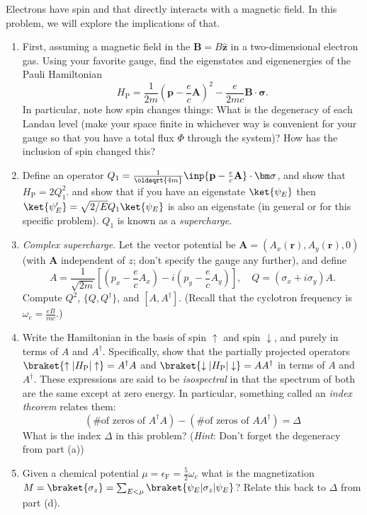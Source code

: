 \documentclass{jhwhw}
\begin{document}
Electrons have spin and that directly interacts with a magnetic field.
In this problem, we will explore the implications of that.
\begin{enumerate}
  \item First, assuming a magnetic field in the $\mathbf B = B\hat{\mathbf z}$ in a two-dimensional electron gas.
  Using your favorite gauge, find the eigenstates and eigenenergies of the Pauli Hamiltonian
        \begin{equation}
          \label{eq:1}
          H_{\mathrm{P}} = \frac1{2m}\left(\mathbf p -\frac{e}{c}\mathbf A \right)^{2} - \frac{e}{2mc} \mathbf B \cdot \bm{\sigma}.
        \end{equation}
    In particular, note how spin changes things: What is the degeneracy of each Landau level (make your space finite in whichever way is convenient for your gauge so that you have a total flux $\Phi$ through the system)? How has the inclusion of spin changed this?
  \item Define an operator $Q_{1} = \frac{1}{\oldsqrt{4m}}\inp{\mathbf p - \frac{e}c \mathbf A} \cdot \bm \sigma$, and show that $H_{\mathrm P}= 2 Q_{1}^{2}$. and show that if you have an eigenstate $\ket{\psi_{E}}$ then $\ket{\psi_{E}'} = \sqrt{2/E}Q_{1} \ket{\psi_{E}}$ is also an eigenstate (in general or for this specific problem). $Q_{1}$ is known as a \emph{supercharge}.
  \item \emph{Complex supercharge}. Let the vector potential be $\mathbf A = (A_{x}(\mathbf r) , A_{y}(\mathbf r) , 0)$ (with $\mathbf A$ independent of $z$; don't specify the gauge any further), and define
        \begin{equation}
          \label{eq:2}
          A = \frac{1}{\sqrt{2m}}\left[\left(p_{x} - \frac{e}{c}A_{x}\right) - i \left(p_{y} - \frac{e}{c} A_{y}\right)\right], \quad
          Q = (\sigma_{x} + i \sigma_{y})A.
        \end{equation}
        Compute $Q^{2}$, $\{Q, Q^{\dagger}\}$, and $[A, A^{\dagger}]$. (Recall that the cyclotron frequency is $\omega_{c} = \frac{eB}{mc}$.)
  \item Write the Hamiltonian in the basis of spin $\uparrow$ and spin $\downarrow$, and purely in terms of $A$ and $A^{\dagger}$. Specifically, show that the partially projected operators $\braket{\uparrow | H_{\mathrm P} |\uparrow} = A^{\dagger}A$ and $\braket{\downarrow| H_{\mathrm P} | \downarrow} = A A^{\dagger}$ in terms of $A$ and $A^{\dagger}$. These expressions are said to be \emph{isospectral} in that the spectrum of both are the same except at zero energy. In particular, something called an \emph{index theorem} relates them:
        \begin{equation}
          \label{eq:3}
          (\text{\# of zeros of $A^{\dagger}A$}) - (\text{\# of zeros of $AA^{\dagger}$}) = \Delta
        \end{equation}
      What is the index $\Delta$ in this problem? (\emph{Hint}: Don't forget the degeneracy from part (a))
  \item Given a chemical potential $\mu = \epsilon_{\mathrm F} = \frac52 \omega_{c}$ what is the magnetization $M = \braket{\sigma_{z}} = \sum_{E<\mu} \braket{\psi_{E} |\sigma_{z}|\psi_{E} }$? Relate this back to $\Delta$ from part (d).
\end{enumerate}
\end{document}

